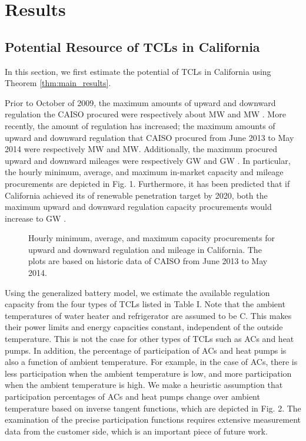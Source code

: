 \documentclass[onecolumn,journal]{IEEEtran}
\begin{document}
\section{Results}
\label{sec:potential}
\subsection{Potential Resource of \acp{TCL} in California}
In this section, we first estimate the potential of \acp{TCL} in California using Theorem \ref{thm:main_results}.

Prior to October of 2009, the maximum amounts of upward and downward regulation the \ac{CAISO} procured were respectively about  MW and  MW \cite{CAISO_regulation}. More recently, the amount of regulation has increased; the maximum amounts of upward and downward regulation that \ac{CAISO} procured from June 2013 to May 2014 were respectively  MW and  MW. Additionally, the maximum procured upward and downward mileages were respectively  GW and  GW \cite{OASIS}.  In particular, the hourly minimum, average, and maximum in-market capacity and mileage procurements are depicted in Fig.  1. Furthermore, it has been predicted that if California achieved its  of renewable penetration target by 2020, both the maximum upward and downward regulation capacity procurements would increase to  GW \cite{helman2010resource}. 

\begin{figure}[tb]
\centering
{}
\caption{Hourly minimum, average, and maximum capacity procurements for upward and downward regulation and mileage in California. The plots are based on historic data of \ac{CAISO} from June 2013 to May 2014.}\label{fig:capacity}
\end{figure}

Using the generalized battery model, we estimate the available regulation capacity from the four types of \acp{TCL} listed in Table I. Note that the ambient  temperatures of water heater and refrigerator are assumed to be C. This makes their power limits and energy capacities constant, independent of the outside temperature. This is not the case for other types of \acp{TCL} such as ACs and heat pumps. In addition, the percentage of participation of ACs and heat pumps is also a function of ambient  temperature. For example, in the case of ACs, there is less participation when the ambient temperature is low, and more participation when the ambient temperature is high. We make a heuristic assumption that participation percentages of ACs and heat pumps change over ambient temperature based on inverse tangent functions, which are depicted in Fig.  2. The examination of the precise participation functions requires extensive measurement data from the customer side, which is an important piece of future work.
\end{document}
